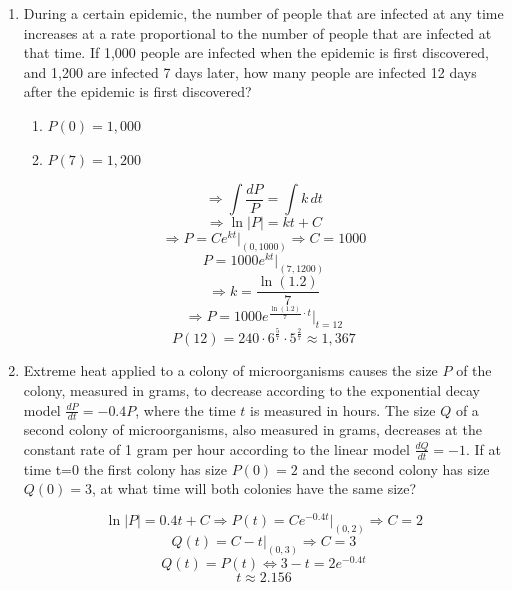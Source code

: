 \documentclass[12pt]{article}
\begin{document}
\begin{enumerate}
    \item During a certain epidemic, the number of people that are infected at any time increases at a rate proportional to the number of people that are infected at that time. If 1,000 people are infected when the epidemic is first discovered, and 1,200 are infected 7 days later, how many people are infected 12 days after the epidemic is first discovered?
\begin{enumerate}
    \item $P(0)=1,000$
    \item $P(7)=1,200$
\end{enumerate}

$$\Longrightarrow \int \frac{dP}{P} = \int k \, dt$$
$$\Longrightarrow \ln|P|=kt +C$$
$$\Longrightarrow P=Ce^{kt}\biggr\rvert_{(0, 1000)} \Longrightarrow C=1000$$
$$ P=1000e^{kt} \biggr\rvert_{(7,1200)}$$
$$\Longrightarrow k=\frac{\ln(1.2)}{7}$$
$$\Longrightarrow P=1000e^{\frac{\ln(1.2)}{7} \cdot t} \biggr\rvert_{t=12}$$
$$\boxed{P(12)=240\cdot 6^{\frac{5}{7}} \cdot 5^{\frac{2}{7}} \approx 1,367}$$
    
    \item Extreme heat applied to a colony of microorganisms causes the size $P$ of the colony, measured in grams, to decrease according to the exponential decay model $\frac{dP}{dt}=-0.4P$, where the time $t$ is measured in hours. The size $Q$ of a second colony of microorganisms, also measured in grams, decreases at the constant rate of 1 gram per hour according to the linear model $\frac{dQ}{dt}=-1$. If at time t=0 the first colony has size $P(0)=2$ and the second colony has size $Q(0)=3$, at what time will both colonies have the same size?

   $$ \ln|P|=0.4t+C \Longrightarrow P(t)=Ce^{-0.4t} \biggr\rvert_{(0,2)} \Longrightarrow C=2$$
    $$Q(t)=C-t \biggr\rvert_{(0,3)} \Longrightarrow C=3$$
$$Q(t)=P(t) \Longleftrightarrow 3-t=2e^{-0.4t}$$
$$\boxed{t \approx 2.156}$$
    

\end{enumerate}
\end{document}
